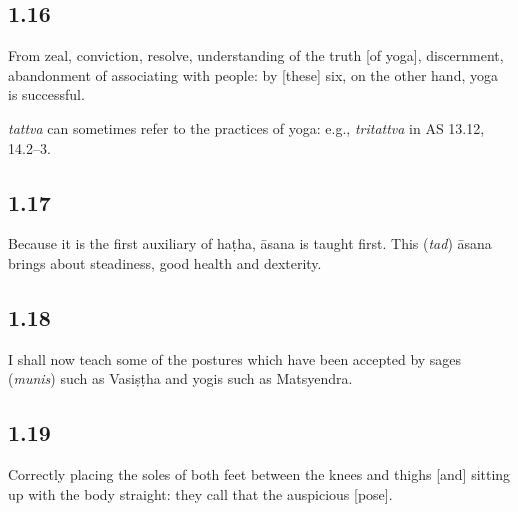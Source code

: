 \begin{ekdosis}
\subsection*{1.16}
\begin{translation}[hp01_016]
From zeal, conviction, resolve, understanding of the truth [of yoga], discernment, abandonment of associating with people: by [these] six, on the other hand, yoga is successful.
\end{translation}

\begin{philcomm}[hp01_016]          
\emph{tattva} can sometimes refer to the practices of yoga: e.g., \emph{tritattva} in AS 13.12, 14.2--3.
\end{philcomm}

\subsection*{1.17}
\begin{translation}[hp01_017]
Because it is the first auxiliary of haṭha, āsana is taught first. This (\emph{tad}) āsana brings about steadiness, good health and dexterity.
\end{translation}


\subsection*{1.18}
\begin{translation}[hp01_018]
I shall now teach some of the postures which have been accepted by sages (\emph{munis}) such as Vasiṣṭha and yogis such as Matsyendra.
\end{translation}


\subsection*{1.19}
\begin{translation}[hp01_019]
Correctly placing the soles of both feet between the knees and thighs [and] sitting up with the body straight: they call that the auspicious [pose].
\end{translation}


\end{ekdosis}
